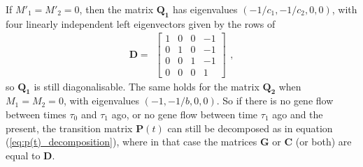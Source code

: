 \documentclass[11pt]{article}
\begin{document}
If  $M'_1=M'_2=0$, 
then the  matrix $\mathbf{Q_1}$  has eigenvalues 
$\left( -1/c_{1}, -1/c_{2},0,0 \right)$,
with four linearly independent left eigenvectors given by the rows of 
$$
\mathbf{D} = \begin{array}{c}
\begin {bmatrix} 
1&0&0&-1\\ 
0&1&0&-1\\
0&0&1&-1\\
0&0&0&1
\end{bmatrix}
\end{array},
$$
so  $\mathbf{Q_1}$ is still diagonalisable.
The same holds for the matrix $\mathbf{Q_2}$ when $M_1=M_2=0$, with eigenvalues $\left( -1, -1/b,0,0 \right)$. So if there is no gene flow between times $\tau_{0}$ and $\tau_{1}$ ago, or no gene flow between time $\tau_{1}$ ago and the present, the transition matrix $\mathbf{P}(t)$ can still be decomposed as in equation (\ref{eq:p(t)_decomposition}), where in that case the matrices $\mathbf{G}$ or $\mathbf{C}$ (or both) are equal to $\mathbf{D}$. 
\end{document}
